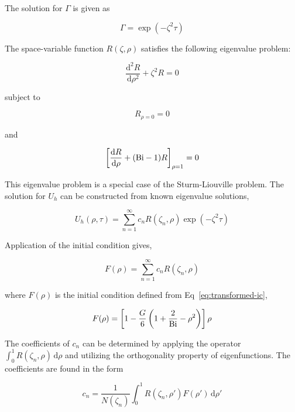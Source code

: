 The solution for $\Gamma$ is given as

\begin{equation}
    \Gamma = \exp(-\zeta^2 \tau)
\end{equation}

The space-variable function $R(\zeta,\rho)$ satisfies the following eigenvalue problem:

\begin{equation}\label{eq:eigen-function}
    \frac{\mathrm{d}^2R}{\mathrm{d}\rho^{2}} + \zeta^2 R = 0
\end{equation}

subject to 

\begin{equation}
    R_{\rho = 0} = 0
\end{equation}

and

\begin{equation}
    \left[\frac{\mathrm{d}R}{\mathrm{d}\rho} + (\mathrm{Bi} - 1)R\right]_{\rho=1} = 0
\end{equation}

This eigenvalue problem is a special case of the Sturm-Liouville problem. The solution for $U_h$ can be constructed from known eigenvalue solutions,

\begin{equation}\label{eq:eigen-general-solution}
    U_h(\rho,\tau) = \sum_{n=1}^\infty c_n R(\zeta_n,\rho)\exp(-\zeta^2 \tau)
\end{equation}

Application of the initial condition gives,

\begin{equation}\label{eq:eigen-initial-condition}
    F(\rho) = \sum_{n=1}^\infty c_n R(\zeta_n,\rho)
\end{equation}

where $F(\rho)$ is the initial condition defined from Eq~\ref{eq:transformed-ic}, 

\begin{equation}
    F(\rho) =\left[1 - \frac{G}{6}\left(1 + \frac{2}{\mathrm{Bi}}-\rho^2\right) \right]\rho
\end{equation}

The coefficients of $c_n$ can be determined by applying the operator $\int_0^1 R(\zeta_n,\rho)\,\mathrm{d}\rho$ and utilizing the orthogonality property of eigenfunctions. The coefficients are found in the form

\begin{equation}\label{eq:eigenfunction-coefficients}
    c_n = \frac{1}{N(\zeta_n)}\int_0^1 R(\zeta_n,\rho')F(\rho')\,\mathrm{d}\rho'
\end{equation}

